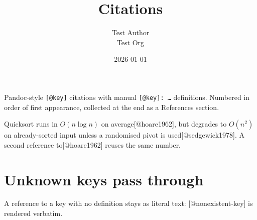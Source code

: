 \documentclass[11pt,a4paper]{article}
\title{Citations}
\author{Test Author \\ Test Org}
\date{2026-01-01}
\theoremstyle{definition}
\begin{document}
\maketitle

Pandoc-style \texttt{[@key]} citations with manual \texttt{[@key]: …} definitions.
Numbered in order of first appearance, collected at the end as a
References section.


Quicksort runs in $O(n \log n)$ on average[@hoare1962], but degrades
to $O(n^2)$ on already-sorted input unless a randomised pivot is
used[@sedgewick1978]. A second reference to[@hoare1962] reuses the
same number.


\section{Unknown keys pass through}

A reference to a key with no definition stays as literal text:
[@nonexistent-key] is rendered verbatim.


% 

% 
\end{document}
